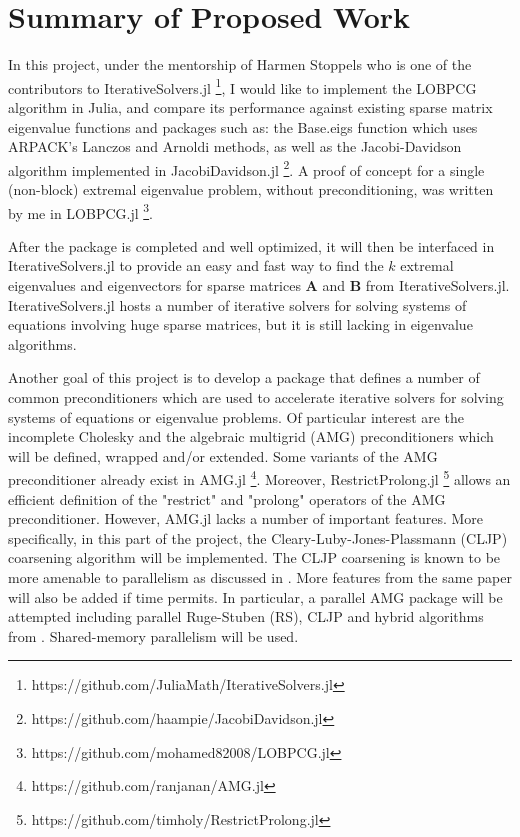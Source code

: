 \documentclass[12pt]{article}
\begin{document}
\section{Summary of Proposed Work}

In this project, under the mentorship of Harmen Stoppels who is one of the contributors to IterativeSolvers.jl \footnote{https://github.com/JuliaMath/IterativeSolvers.jl}, I would like to implement the LOBPCG algorithm in Julia, and compare its performance against existing sparse matrix eigenvalue functions and packages such as: the Base.eigs function which uses ARPACK's Lanczos and Arnoldi methods, as well as the Jacobi-Davidson algorithm implemented in JacobiDavidson.jl \footnote{https://github.com/haampie/JacobiDavidson.jl}. A proof of concept for a single (non-block) extremal eigenvalue problem, without preconditioning, was written by me in LOBPCG.jl \footnote{https://github.com/mohamed82008/LOBPCG.jl}.

After the package is completed and well optimized, it will then be interfaced in IterativeSolvers.jl to provide an easy and fast way to find the $k$ extremal eigenvalues and eigenvectors for sparse matrices $\bm{A}$ and $\bm{B}$ from IterativeSolvers.jl. IterativeSolvers.jl hosts a number of iterative solvers for solving systems of equations involving huge sparse matrices, but it is still lacking in eigenvalue algorithms.

Another goal of this project is to develop a package that defines a number of common preconditioners which are used to accelerate iterative solvers for solving systems of equations or eigenvalue problems. Of particular interest are the incomplete Cholesky and the algebraic multigrid (AMG) preconditioners which will be defined, wrapped and/or extended. Some variants of the AMG preconditioner already exist in AMG.jl \footnote{https://github.com/ranjanan/AMG.jl}. Moreover, RestrictProlong.jl \footnote{https://github.com/timholy/RestrictProlong.jl} allows an efficient definition of the "restrict" and "prolong" operators of the AMG preconditioner. However, AMG.jl lacks a number of important features. More specifically, in this part of the project, the Cleary-Luby-Jones-Plassmann (CLJP) coarsening algorithm will be implemented. The CLJP coarsening is known to be more amenable to parallelism as discussed in \cite{Henson2002}. More features from the same paper will also be added if time permits. In particular, a parallel AMG package will be attempted including parallel Ruge-Stuben (RS), CLJP and hybrid algorithms from \cite{Henson2002}. Shared-memory parallelism will be used.
\end{document}
